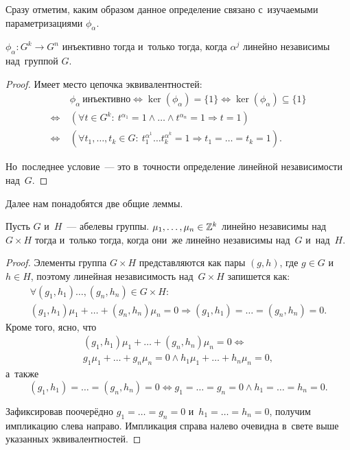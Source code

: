 \documentclass[a4paper,oneside]{article}
\begin{document}
Сразу отметим, каким образом данное определение связано с~изучаемыми параметризациями $\phi_\alpha$.

\begin{theorem}
  $\phi_\alpha : G^k \rightarrow G^n$ инъективно тогда и~только тогда, когда $\alpha^j$ линейно независимы над~группой $G$.
\end{theorem}

\begin{proof}
  Имеет место цепочка эквивалентностей:
  \[
  \begin{aligned}
                     \ & \phi_\alpha\ \text{инъективно}
      \Leftrightarrow \ker(\phi_\alpha) = \{ 1 \}
      \Leftrightarrow \ker(\phi_\alpha) \subseteq \{ 1 \} \\
      \Leftrightarrow\ & (\forall t \in G^k{:}\ t^{\alpha_1} = 1 \wedge \ldots \wedge t^{\alpha_n} = 1 \Rightarrow t = 1) \\
      \Leftrightarrow\ & (\forall t_1, \ldots, t_k \in G{:}\ t_1^{\alpha^1} \ldots t_k^{\alpha^k} = 1 \Rightarrow t_1 = \ldots = t_k = 1).
  \end{aligned}
  \]

  Но~последнее условие~— это в~точности определение линейной независимости над~$G$.
\end{proof}

Далее нам понадобятся две общие леммы.

\begin{lemma}
  Пусть $G$ и~$H$~— абелевы группы. $\mu_1, \ldots, \mu_n \in \mathbb{Z}^k$ линейно независимы над~$G \times H$
  тогда и~только тогда, когда они~же линейно независимы над~$G$ и~над~$H$.
\end{lemma}

\begin{proof}
  Элементы группа $G \times H$ представляются как пары $(g, h)$, где $g \in G$ и~$h \in H$, поэтому
  линейная независимость над~$G \times H$ запишется как:
  \begin{gather*}
    \forall (g_1, h_1) \ldots, (g_n, h_n) \in G \times H{:}\\ (g_1, h_1) \mu_1 + \ldots + (g_n, h_n) \mu_n = 0 \Rightarrow (g_1, h_1) = \ldots = (g_n, h_n) = 0.
  \end{gather*}
  Кроме того, ясно, что
  \begin{gather*}
    (g_1, h_1) \mu_1 + \ldots + (g_n, h_n) \mu_n = 0 \Leftrightarrow\\ g_1 \mu_1 + \ldots + g_n \mu_n = 0 \wedge h_1 \mu_1 + \ldots + h_n \mu_n = 0,
  \end{gather*}
  а~также
  \[
    (g_1, h_1) = \ldots = (g_n, h_n) = 0 \Leftrightarrow g_1 = \ldots = g_n = 0 \wedge h_1 = \ldots = h_n = 0.
  \]

  Зафиксировав поочерёдно $g_1 = \ldots = g_n = 0$ и~$h_1 = \ldots = h_n = 0$, получим импликацию слева направо.
  Импликация справа налево очевидна в~свете выше указанных эквивалентностей.
\end{proof}
\end{document}
